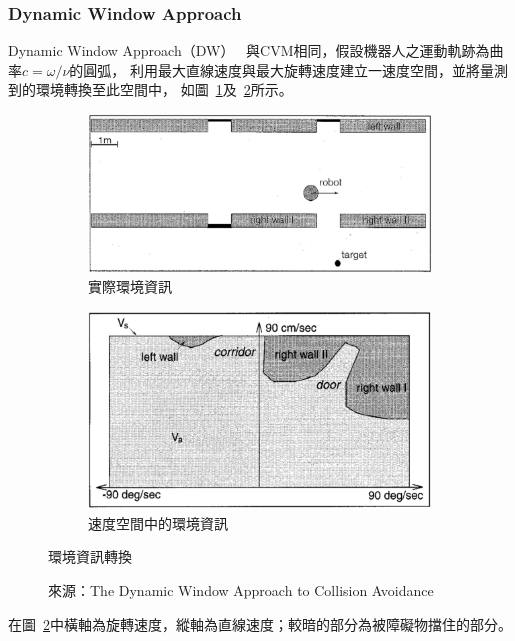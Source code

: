 \subsubsection{Dynamic Window Approach}
Dynamic Window Approach（DW）~\cite{Thrun:1997:DW}
與CVM相同，假設機器人之運動軌跡為曲率$c=\omega/\nu$的圓弧，
利用最大直線速度與最大旋轉速度建立一速度空間，並將量測到的環境轉換至此空間中，
如圖~\ref{f:DW_cartesian}及~\ref{f:DW_velocity}所示。
\begin{figure}[h!]
	\centering
	\begin{subfigure}[t]{0.6\textwidth}
		\includegraphics[width=\textwidth]{figures/DW_cartesian}
		\caption{實際環境資訊}
		\label{f:DW_cartesian}
	\end{subfigure}
	\begin{subfigure}[t]{0.6\textwidth}
		\includegraphics[width=\textwidth]{figures/DW_velocity}
		\caption{速度空間中的環境資訊}
		\label{f:DW_velocity}
	\end{subfigure}
	\caption{環境資訊轉換}
	\caption*{來源：The Dynamic Window Approach to Collision Avoidance}
	\label{f:v_space}
\end{figure}
在圖~\ref{f:DW_velocity}中橫軸為旋轉速度，縱軸為直線速度；較暗的部分為被障礙物擋住的部分。

